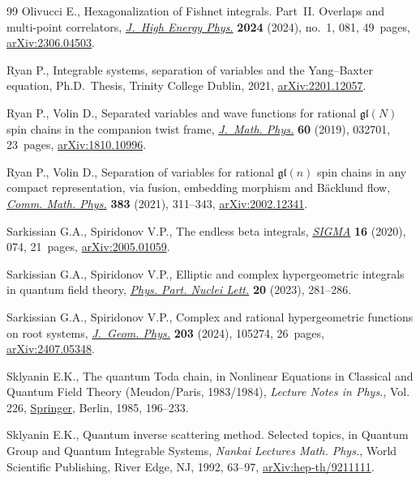 \documentclass[10pt,a4paper]{amsart}
\numberwithin{equation}{section}
\begin{document}
\begin{thebibliography}{99}
Olivucci E., Hexagonalization of {F}ishnet integrals. {P}art~{II}. {O}verlaps
 and multi-point correlators,
 \href{https://doi.org/10.1007/jhep01(2024)081}{\textit{J.~High Energy Phys.}}
 \textbf{2024} (2024), no.~1, 081, 49~pages,
 \href{http://arxiv.org/abs/2306.04503}{arXiv:2306.04503}.

Ryan P., Integrable systems, separation of variables and the {Y}ang--{B}axter
 equation, Ph.D.~Thesis, {T}rinity College Dublin, 2021,
 \href{http://arxiv.org/abs/2201.12057}{arXiv:2201.12057}.

Ryan P., Volin D., Separated variables and wave functions for rational
 {$\mathfrak{gl}(N)$} spin chains in the companion twist frame,
 \href{https://doi.org/10.1063/1.5085387}{\textit{J.~Math. Phys.}} \textbf{60}
 (2019), 032701, 23~pages,
 \href{http://arxiv.org/abs/1810.10996}{arXiv:1810.10996}.

Ryan P., Volin D., Separation of variables for rational {$\mathfrak{gl}(n)$}
 spin chains in any compact representation, via fusion, embedding morphism and
 {B}\"acklund flow,
 \href{https://doi.org/10.1007/s00220-021-03990-7}{\textit{Comm. Math. Phys.}}
 \textbf{383} (2021), 311--343,
 \href{http://arxiv.org/abs/2002.12341}{arXiv:2002.12341}.

Sarkissian G.A., Spiridonov V.P., The endless beta integrals,
 \href{https://doi.org/10.3842/SIGMA.2020.074}{\textit{SIGMA}} \textbf{16}
 (2020), 074, 21~pages,
 \href{http://arxiv.org/abs/2005.01059}{arXiv:2005.01059}.

Sarkissian G.A., Spiridonov V.P., Elliptic and complex hypergeometric integrals
 in quantum field theory,
 \href{https://doi.org/10.1134/S1547477123030603}{\textit{Phys. Part. Nuclei
 Lett.}} \textbf{20} (2023), 281--286.

Sarkissian G.A., Spiridonov V.P., Complex and rational hypergeometric functions
 on root systems,
 \href{https://doi.org/10.1016/j.geomphys.2024.105274}{\textit{J.~Geom.
 Phys.}} \textbf{203} (2024), 105274, 26~pages,
 \href{http://arxiv.org/abs/2407.05348}{arXiv:2407.05348}.

Sklyanin E.K., The quantum {T}oda chain, in Nonlinear Equations in Classical
 and Quantum Field Theory ({M}eudon/{P}aris, 1983/1984), \textit{Lecture Notes
 in Phys.}, Vol. 226,
 \href{https://doi.org/10.1007/3-540-15213-X_80}{Springer}, Berlin, 1985,
 196--233.

Sklyanin E.K., Quantum inverse scattering method. {S}elected topics, in Quantum
 Group and Quantum Integrable Systems, \textit{Nankai Lectures Math. Phys.}, World
 Scientific Publishing, River Edge, NJ, 1992, 63--97,
 \href{http://arxiv.org/abs/hep-th/9211111}{arXiv:hep-th/9211111}.


\end{thebibliography}
\end{document}
